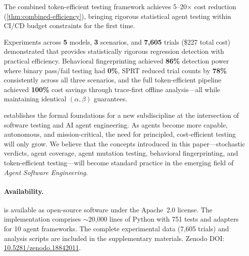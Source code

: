 The combined token-efficient testing framework achieves
5--20$\times$ cost reduction (\cref{thm:combined-efficiency}), bringing
rigorous statistical agent testing within CI/CD budget constraints for
the first time.

Experiments across \textbf{5} models, \textbf{3} scenarios, and
\textbf{7{,}605} trials (\$227 total cost) demonstrated that \agentassay{}
provides statistically rigorous regression detection with practical
efficiency. Behavioral fingerprinting achieved \textbf{86\%} detection
power where binary pass/fail testing had \textbf{0\%}, SPRT reduced
trial counts by \textbf{78\%} consistently across all three scenarios,
and the full token-efficient pipeline achieved \textbf{100\%} cost
savings through trace-first offline analysis---all while maintaining
identical $(\alpha, \beta)$ guarantees.

\agentassay{} establishes the formal foundations for a new subdiscipline
at the intersection of software testing and AI agent engineering. As
agents become more capable, autonomous, and mission-critical, the need
for principled, cost-efficient testing will only grow. We believe that
the concepts introduced in this paper---stochastic verdicts, agent
coverage, agent mutation testing, behavioral fingerprinting, and
token-efficient testing---will become standard practice in the emerging
field of \emph{Agent Software Engineering}.

\paragraph{Availability.}
\agentassay{} is available as open-source software under the
Apache~2.0 license. The implementation comprises ${\sim}$20{,}000 lines of
Python with 751 tests and adapters for 10 agent frameworks. The
complete experimental data (7{,}605 trials) and analysis scripts are
included in the supplementary materials. Zenodo DOI:
\href{https://doi.org/10.5281/zenodo.18842011}{10.5281/zenodo.18842011}.
